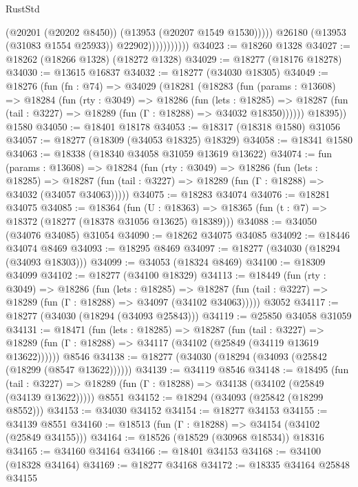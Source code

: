\begin{lexlean}{RustStd}
\begin{coremodule}
                                (@20201 (@20202 @8450))
                                (@13953 (@20207 @1549 @1530)))))
                          @26180
                          (@13953 (@31083 @1554 @25933))
                          @22902)))))))))))
@34023 := @18260 @1328
@34027 := @18262 (@18266 @1328) (@18272 @1328)
@34029 := @18277 (@18176 @18278)
@34030 := @13615 @16837
@34032 := @18277 (@34030 @18305)
@34049 := @18276
    (fun (fn : @74) =>
    @34029
      (@18281
        (@18283
          (fun (params : @13608) =>
          @18284
            (fun (rty : @3049) =>
            @18286
              (fun (lets : @18285) =>
              @18287 (fun (tail : @3227) => @18289 (fun (Γ : @18288) => @34032 @18350))))))
        @18395))
    @1580
@34050 := @18401 @18178
@34053 := @18317 (@18318 @1580) @31056
@34057 := @18277 (@18309 (@34053 @18325) @18329)
@34058 := @18341 @1580
@34063 := @18338 (@18340 @34058 @31059 @13619 @13622)
@34074 := fun (params : @13608) =>
  @18284
    (fun (rty : @3049) =>
    @18286
      (fun (lets : @18285) =>
      @18287 (fun (tail : @3227) => @18289 (fun (Γ : @18288) => @34032 (@34057 @34063)))))
@34075 := @18283 @34074
@34076 := @18281 @34075
@34085 := @18364
    (fun (U : @18363) => @18365 (fun (t : @7) => @18372 (@18277 (@18378 @31056 @13625) @18389)))
@34088 := @34050 (@34076 @34085) @31054
@34090 := @18262 @34075 @34085
@34092 := @18446 @34074 @8469
@34093 := @18295 @8469
@34097 := @18277 (@34030 (@18294 (@34093 @18303)))
@34099 := @34053 (@18324 @8469)
@34100 := @18309 @34099
@34102 := @18277 (@34100 @18329)
@34113 := @18449
    (fun (rty : @3049) =>
    @18286
      (fun (lets : @18285) =>
      @18287 (fun (tail : @3227) => @18289 (fun (Γ : @18288) => @34097 (@34102 @34063)))))
    @3052
@34117 := @18277 (@34030 (@18294 (@34093 @25843)))
@34119 := @25850 @34058 @31059
@34131 := @18471
    (fun (lets : @18285) =>
    @18287
      (fun (tail : @3227) =>
      @18289 (fun (Γ : @18288) => @34117 (@34102 (@25849 (@34119 @13619 @13622))))))
    @8546
@34138 := @18277 (@34030 (@18294 (@34093 (@25842 (@18299 (@8547 @13622))))))
@34139 := @34119 @8546
@34148 := @18495
    (fun (tail : @3227) => @18289 (fun (Γ : @18288) => @34138 (@34102 (@25849 (@34139 @13622)))))
    @8551
@34152 := @18294 (@34093 (@25842 (@18299 @8552)))
@34153 := @34030 @34152
@34154 := @18277 @34153
@34155 := @34139 @8551
@34160 := @18513 (fun (Γ : @18288) => @34154 (@34102 (@25849 @34155)))
@34164 := @18526 (@18529 (@30968 @18534)) @18316
@34165 := @34160 @34164
@34166 := @18401 @34153
@34168 := @34100 (@18328 @34164)
@34169 := @18277 @34168
@34172 := @18335 @34164 @25848 @34155

\end{coremodule}
\end{lexlean}
